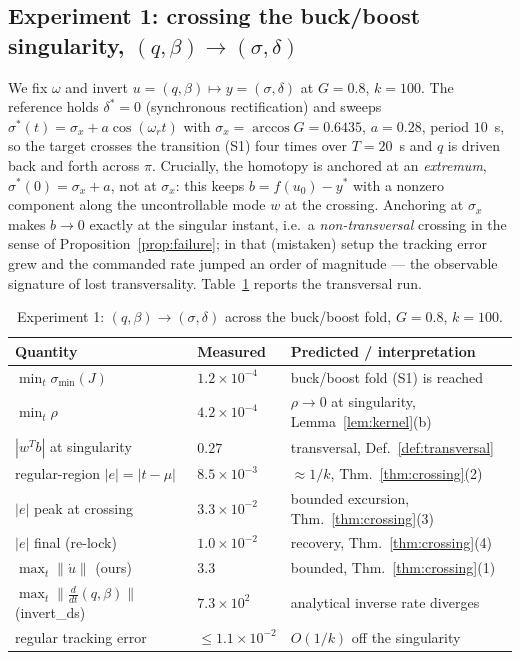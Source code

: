 \documentclass[11pt,american]{article}
\theoremstyle{definition}
\theoremstyle{plain}
\theoremstyle{remark}
\begin{document}
\subsection{Experiment 1: crossing the buck/boost singularity, $(q,\beta)\to(\sigma,\delta)$}

We fix $\omega$ and invert $u=(q,\beta)\mapsto y=(\sigma,\delta)$ at $G=0.8$, $k=100$. The reference holds $\delta^*=0$ (synchronous rectification) and sweeps $\sigma^*(t) = \sigma_x + a\cos(\omega_r t)$ with $\sigma_x = \arccos G = 0.6435$, $a=0.28$, period $10$~s, so the target crosses the transition (S1) four times over $T=20$~s and $q$ is driven back and forth across $\pi$. Crucially, the homotopy is anchored at an \emph{extremum}, $\sigma^*(0)=\sigma_x + a$, not at $\sigma_x$: this keeps $b = f(u_0)-y^*$ with a nonzero component along the uncontrollable mode $w$ at the crossing. Anchoring at $\sigma_x$ makes $b\to 0$ exactly at the singular instant, i.e.\ a \emph{non-transversal} crossing in the sense of Proposition~\ref{prop:failure}; in that (mistaken) setup the tracking error grew and the commanded rate jumped an order of magnitude --- the observable signature of lost transversality. Table~\ref{tab:pe1} reports the transversal run.

\begin{table}[h]
\centering
\begin{tabular}{l l l}
\hline
Quantity & Measured & Predicted / interpretation \\
\hline
$\min_t \sigma_{\min}(J)$ & $1.2\times 10^{-4}$ & buck/boost fold (S1) is reached \\
$\min_t \rho$ & $4.2\times 10^{-4}$ & $\rho\to 0$ at singularity, Lemma~\ref{lem:kernel}(b) \\
$|w^T b|$ at singularity & $0.27$ & transversal, Def.~\ref{def:transversal} \\
regular-region $|e|=|t-\mu|$ & $8.5\times 10^{-3}$ & $\approx 1/k$, Thm.~\ref{thm:crossing}(2) \\
$|e|$ peak at crossing & $3.3\times 10^{-2}$ & bounded excursion, Thm.~\ref{thm:crossing}(3) \\
$|e|$ final (re-lock) & $1.0\times 10^{-2}$ & recovery, Thm.~\ref{thm:crossing}(4) \\
$\max_t \|\dot u\|$ (ours) & $3.3$ & bounded, Thm.~\ref{thm:crossing}(1) \\
$\max_t \|\tfrac{d}{dt}(q,\beta)\|$ (invert\_ds) & $7.3\times 10^{2}$ & analytical inverse rate diverges \\
regular tracking error & $\le 1.1\times 10^{-2}$ & $O(1/k)$ off the singularity \\
\hline
\end{tabular}
\caption{Experiment 1: $(q,\beta)\to(\sigma,\delta)$ across the buck/boost fold, $G=0.8$, $k=100$.}
\label{tab:pe1}
\end{table}
\end{document}
